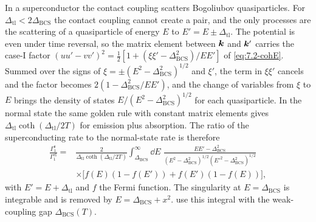 In a superconductor the contact coupling scatters Bogoliubov quasiparticles. For $\Delta_{\mathrm{tl}} < 2\Delta_{\mathrm{BCS}}$ the contact coupling cannot create a pair, and the only processes are the scattering of a quasiparticle of energy $E$ to $E' = E \pm \Delta_{\mathrm{tl}}$. The potential is even under time reversal, so the matrix element between $\bm{k}$ and $\bm{k}'$ carries the case-I factor $(uu' - vv')^2 = \tfrac12[1 + (\xi\xi' - \Delta_{\mathrm{BCS}}^2)/EE']$ of \cref{eq:7.2-cohE}. Summed over the signs of $\xi = \pm(E^2 - \Delta_{\mathrm{BCS}}^2)^{1/2}$ and $\xi'$, the term in $\xi\xi'$ cancels and the factor becomes $2(1 - \Delta_{\mathrm{BCS}}^2/EE')$, and the change of variables from $\xi$ to $E$ brings the density of states $E/(E^2 - \Delta_{\mathrm{BCS}}^2)^{1/2}$ for each quasiparticle. In the normal state the same golden rule with constant matrix elements gives $\Delta_{\mathrm{tl}}\coth(\Delta_{\mathrm{tl}}/2T)$ for emission plus absorption. The ratio of the superconducting rate to the normal-state rate is therefore
\begin{equation}
  \begin{split}
  \frac{\varGamma_1^{\mathrm{s}}}{\varGamma_1^{\mathrm{el}}} = {}&\frac{2}{\Delta_{\mathrm{tl}}\coth(\Delta_{\mathrm{tl}}/2T)}\int_{\Delta_{\mathrm{BCS}}}^\infty\dd E\;
  \frac{EE' - \Delta_{\mathrm{BCS}}^2}{(E^2 - \Delta_{\mathrm{BCS}}^2)^{1/2}(E'^2 - \Delta_{\mathrm{BCS}}^2)^{1/2}} \\
  &\times\bigl[f(E)(1 - f(E')) + f(E')(1 - f(E))\bigr] ,
  \end{split}
  \label{eq:D.42-Rs}
\end{equation}
with $E' = E + \Delta_{\mathrm{tl}}$ and $f$ the Fermi function. The singularity at $E = \Delta_{\mathrm{BCS}}$ is integrable and is removed by $E = \Delta_{\mathrm{BCS}} + x^2$.  use this integral with the weak-coupling gap $\Delta_{\mathrm{BCS}}(T)$.

